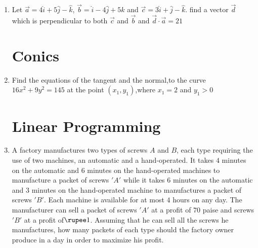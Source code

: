 \documentclass[10pt,-letter paper]{article}
\providecommand{\brak}[1]{\ensuremath{\left(#1\right)}}
\begin{document}
\begin{enumerate}
\item Let $\overrightarrow{a}=4\hat{i}+5\hat{j}-\hat{k}$, $\overrightarrow{b}=\hat{i}-4\hat{j}+5\hat{k}$ and $\overrightarrow{c}=3\hat{i}+\hat{j}-\hat{k}$. find a vector $\overrightarrow{d}$ which is perpendicular to both $\overrightarrow{c}$ and $\overrightarrow{b}$ and $\overrightarrow{d}\cdot \overrightarrow{a}=21$


\section{Conics}
\item Find the equations of the tangent and the normal,to the curve $16x^{2}+9y^{2}=145$ at the point $\brak{x_1,y_1}$,where $x_1=2$ and $y_1>0$
	








	







\section{Linear Programming}
\item A factory manufactures two types of screws $A$ and $B$, each type requiring the use of two machines, an automatic and a hand-operated. It takes $4$ minutes on the automatic and $6$ minutes on the hand-operated machines to manufacture a packet of screws $'A'$ while it takes $6$ minutes on the automatic and $3$ minutes on the hand-operated machine to manufactures a packet of screws $'B'$. Each machine is available for at most $4$ hours on any day. The manufacturer can sell a packet of screws $'A'$ at a profit of $70$ paise and screws $'B'$ at a profit of$\rupee 1$. Assuming that he can sell all the screws he manufactures, how many packets of each type should the factory owner produce in a day in order to maximize his profit.




\end{enumerate}
\end{document}

